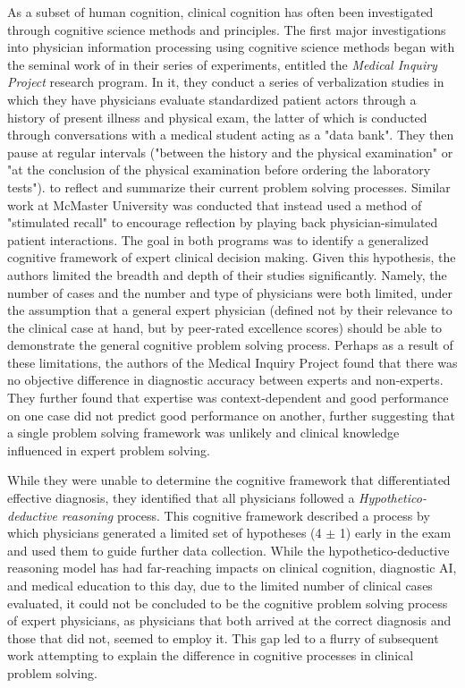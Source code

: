 As a subset of human cognition, clinical cognition has often been investigated through cognitive science methods and principles. The first major investigations into physician information processing using cognitive science methods began with the seminal work of \citet{elstein1978medical} in their series of experiments, entitled the \emph{Medical Inquiry Project} research program. In it, they conduct a series of verbalization studies in which they have physicians evaluate standardized patient actors through a history of present illness and physical exam, the latter of which is conducted through conversations with a medical student acting as a "data bank". They then pause at regular intervals ("between the history and the physical examination" or "at the conclusion of the physical examination before ordering the laboratory tests")\cite{A STUDY OF THE MEDICAL DIAGNOSTIC PROCESS: METHOD AND PRELIMINARY FINDINGS-Elstein}.  to reflect and summarize their current problem solving processes. Similar work at McMaster University was conducted that instead used a method of "stimulated recall" to encourage reflection by playing back physician-simulated patient interactions. The goal in both programs was to identify a generalized cognitive framework of expert clinical decision making. Given this hypothesis, the authors limited the breadth and depth of their studies significantly. Namely, the number of cases and the number and type of physicians were both limited, under the assumption that a general expert physician (defined not by their relevance to the clinical case at hand, but by peer-rated excellence scores) should be able to demonstrate the general cognitive problem solving process. Perhaps as a result of these limitations, the authors of the Medical Inquiry Project found that there was no objective difference in diagnostic accuracy between experts and non-experts. They further found that expertise was context-dependent and good performance on one case did not predict good performance on another, further suggesting that a single problem solving framework was unlikely and clinical knowledge influenced in expert problem solving. 

While they were unable to determine the cognitive framework that differentiated effective diagnosis, they identified that all physicians followed a \emph{Hypothetico-deductive reasoning} process. This cognitive framework described a process by which physicians generated a limited set of hypotheses (4 $\pm$ 1) early in the exam and used them to guide further data collection. While the hypothetico-deductive reasoning model has had far-reaching impacts on clinical cognition, diagnostic AI, and medical education to this day, due to the limited number of clinical cases evaluated, it could not be concluded to be the cognitive problem solving process of expert physicians, as physicians that both arrived at the correct diagnosis and those that did not, seemed to employ it. This gap led to a flurry of subsequent work attempting to explain the difference in cognitive processes in clinical problem solving. 


